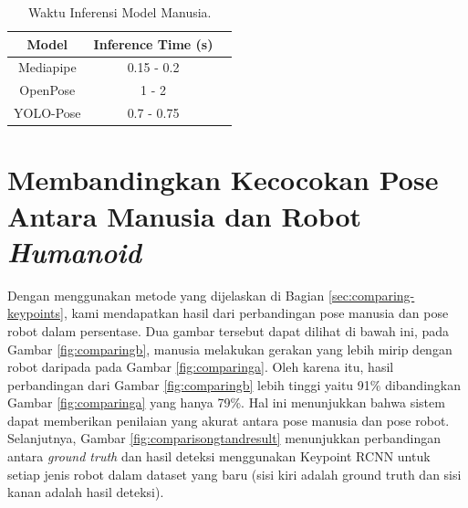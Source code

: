 \begin{longtable}{|c|c|c|}
  \caption{Waktu Inferensi Model Manusia.}
  \label{tb:inferencehuman}\\
  \hline
  \rowcolor[HTML]{C0C0C0}
  \textbf{Model}    & \textbf{Inference Time (s)} \\
  \hline
  Mediapipe   & 0.15 - 0.2\\
  \hline
  OpenPose    & 1 - 2\\
  \hline
  YOLO-Pose   & 0.7 - 0.75\\
  \hline
\end{longtable}

\section{Membandingkan Kecocokan Pose Antara Manusia dan Robot \textit{Humanoid}}
\label{sec:comparingsuitabilityresults}

Dengan menggunakan metode yang dijelaskan di Bagian \ref{sec:comparing-keypoints}, kami mendapatkan hasil dari perbandingan pose manusia dan pose robot dalam persentase.
Dua gambar tersebut dapat dilihat di bawah ini, pada Gambar \ref{fig:comparingb}, manusia melakukan gerakan yang lebih mirip dengan robot daripada pada Gambar \ref{fig:comparinga}.
Oleh karena itu, hasil perbandingan dari Gambar \ref{fig:comparingb} lebih tinggi yaitu 91\% dibandingkan Gambar \ref{fig:comparinga} yang hanya 79\%.
Hal ini menunjukkan bahwa sistem dapat memberikan penilaian yang akurat antara pose manusia dan pose robot.
Selanjutnya, Gambar \ref{fig:comparisongtandresult} menunjukkan perbandingan antara \textit{ground truth} dan hasil deteksi menggunakan Keypoint RCNN untuk setiap jenis robot dalam dataset yang baru
(sisi kiri adalah ground truth dan sisi kanan adalah hasil deteksi).

